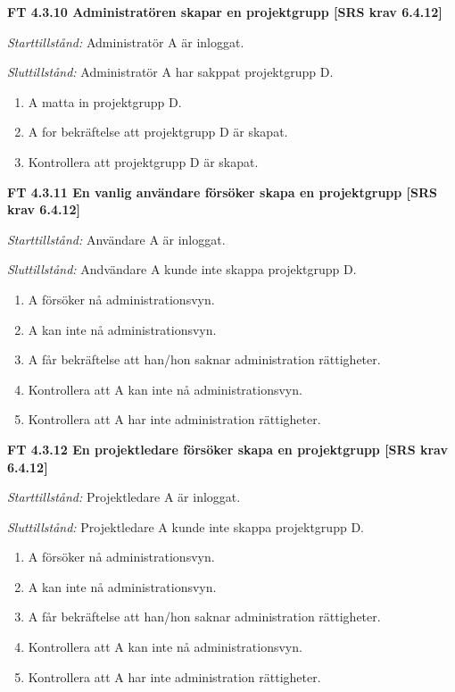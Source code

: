 \documentclass[a4paper]{article}
\begin{document}
\textbf{FT 4.3.10 Administratören skapar en projektgrupp [SRS krav 6.4.12]}

\emph{Starttillstånd:} Administratör A är inloggat.

\emph{Sluttillstånd:} Administratör A har sakppat projektgrupp D.

\begin{enumerate}
\item A matta in projektgrupp D.
\item A for bekräftelse att projektgrupp D är skapat.
\item Kontrollera att projektgrupp D är skapat.
\end{enumerate}

\textbf{FT 4.3.11 En vanlig användare försöker skapa en projektgrupp [SRS krav 6.4.12]}

\emph{Starttillstånd:} Användare A är inloggat.

\emph{Sluttillstånd:} Andvändare A kunde inte skappa projektgrupp D.

\begin{enumerate}
\item A försöker nå administrationsvyn.
\item A kan inte nå administrationsvyn.
\item A får bekräftelse att han/hon saknar administration rättigheter.
\item Kontrollera att A kan inte nå administrationsvyn.
\item Kontrollera att A har inte administration rättigheter.
\end{enumerate}

\textbf{FT 4.3.12 En projektledare försöker skapa en projektgrupp [SRS krav 6.4.12]}

\emph{Starttillstånd:} Projektledare A är inloggat.

\emph{Sluttillstånd:} Projektledare A kunde inte skappa projektgrupp D.

\begin{enumerate}
\item A försöker nå administrationsvyn.
\item A kan inte nå administrationsvyn.
\item A får bekräftelse att han/hon saknar administration rättigheter.
\item Kontrollera att A kan inte nå administrationsvyn.
\item Kontrollera att A har inte administration rättigheter.

\end{enumerate}
\end{document}

